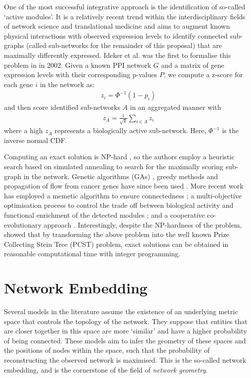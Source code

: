 \documentclass{report}
\begin{document}
	One of the most successful integrative approach is the identification of so-called `active modules'. It is a relatively recent trend within the interdisciplinary fields of network science and translational medicine and aims to augment known physical interactions with observed expression levels to identify connected sub-graphs (called sub-networks for the remainder of this proposal) that are maximally differently expressed. Ideker et al. was the first to formalise this problem in \cite{ideker2002discovering} in 2002. Given a known PPI network $G$ and a matrix of gene expression levels with their corresponding p-values $P$, we compute a z-score for each gene $i$ in the network as:
	\begin{align}
	z_i = \Phi^{-1}(1 - p_i)
	\end{align}
	and then score identified sub-networks $A$ in an aggregated manner with 
	\begin{align}
	z_A = \frac{1}{\sqrt{k}}\sum_{i\in A}z_i
	\label{ideker}
	\end{align}
	where a high $z_A$ represents a biologically active sub-network. Here, $\Phi^{-1}$ is the inverse normal CDF.
	
	Computing an exact solution is NP-hard \cite{ideker2002discovering}, so the authors employ a heuristic search based on simulated annealing to search for the maximally scoring sub-graph in the network. Genetic algorithms (GAs) \cite{Klammer2010}, greedy methods \cite{nacu2007gene} and propagation of flow from cancer genes have since been used \cite{vandin2011algorithms}. More recent work has employed a memetic algorithm to ensure connectedness \cite{li2017active}; a multi-objective optimisation process to control the trade off between biological activity and functional enrichment of the detected modules \cite{chen2017prior}; and a cooperative co-evolutionary approach \cite{he2016cooperative}. Interestingly, despite the NP-hardness of the problem, \cite{dittrich2008identifying} showed that by transforming the above problem into the well known Prize Collecting Stein Tree (PCST) problem, exact solutions can be obtained in reasonable computational time with integer programming.
	
	
	\section{Network Embedding}
	
	Several models in the literature assume the existence of an underlying metric space that controls the topology of the network. They suppose that entities that are closer together in this space are more `similar' and have a higher probability of being connected. These models aim to infer the geometry of these spaces and the positions of nodes within the space, such that the probability of reconstructing the observed network is maximised. This is the so-called network embedding, and is the cornerstone of the field of \textit{network geometry}. 
\end{document}
